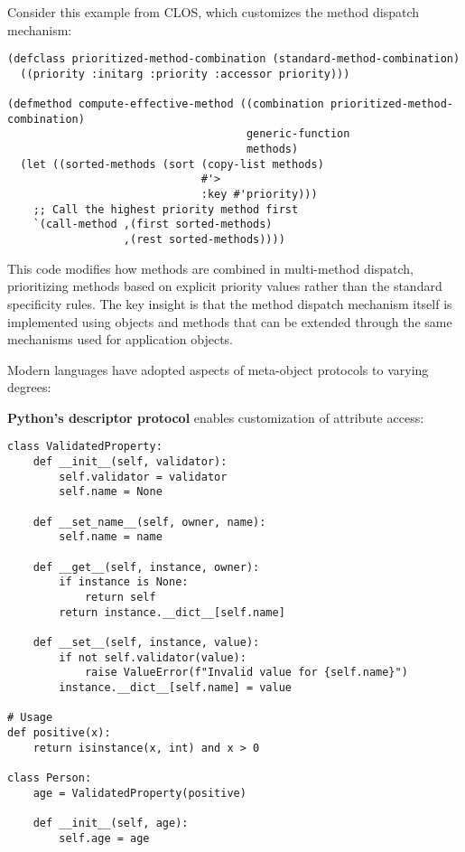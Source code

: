 \documentclass[11pt]{article}
\begin{document}
Consider this example from CLOS, which customizes the method dispatch mechanism:

\begin{verbatim}
(defclass prioritized-method-combination (standard-method-combination)
  ((priority :initarg :priority :accessor priority)))

(defmethod compute-effective-method ((combination prioritized-method-combination)
                                     generic-function
                                     methods)
  (let ((sorted-methods (sort (copy-list methods)
                              #'>
                              :key #'priority)))
    ;; Call the highest priority method first
    `(call-method ,(first sorted-methods)
                  ,(rest sorted-methods))))
\end{verbatim}

This code modifies how methods are combined in multi-method dispatch, prioritizing methods based on explicit priority values rather than the standard specificity rules. The key insight is that the method dispatch mechanism itself is implemented using objects and methods that can be extended through the same mechanisms used for application objects.

Modern languages have adopted aspects of meta-object protocols to varying degrees:

\textbf{\textbf{Python's descriptor protocol}} enables customization of attribute access:

\begin{verbatim}
class ValidatedProperty:
    def __init__(self, validator):
        self.validator = validator
        self.name = None
        
    def __set_name__(self, owner, name):
        self.name = name
        
    def __get__(self, instance, owner):
        if instance is None:
            return self
        return instance.__dict__[self.name]
        
    def __set__(self, instance, value):
        if not self.validator(value):
            raise ValueError(f"Invalid value for {self.name}")
        instance.__dict__[self.name] = value

# Usage
def positive(x):
    return isinstance(x, int) and x > 0

class Person:
    age = ValidatedProperty(positive)
    
    def __init__(self, age):
        self.age = age
\end{verbatim}
\end{document}

